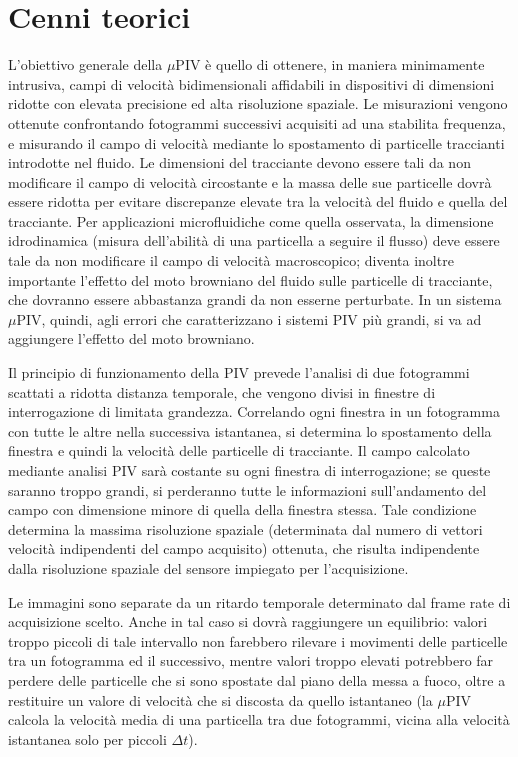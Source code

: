 \documentclass{article} %
\begin{document}
\section{Cenni teorici}
L'obiettivo generale della $\mu$PIV è quello di ottenere, in maniera minimamente intrusiva, campi di velocità bidimensionali affidabili in dispositivi di dimensioni ridotte con elevata precisione ed alta risoluzione spaziale. Le misurazioni vengono ottenute confrontando fotogrammi successivi acquisiti ad una stabilita frequenza, e misurando il campo di velocità mediante lo spostamento di particelle traccianti introdotte nel fluido. Le dimensioni del tracciante devono essere tali da non modificare il campo di velocità circostante e la massa delle sue particelle dovrà essere ridotta per evitare discrepanze elevate tra la velocità del fluido e quella del tracciante. Per applicazioni microfluidiche come quella osservata, la dimensione idrodinamica (misura dell'abilità di una particella a seguire il flusso) deve essere tale da non modificare il campo di velocità macroscopico; diventa inoltre importante l'effetto del moto browniano del fluido sulle particelle di tracciante, che dovranno essere abbastanza grandi da non esserne perturbate. In un sistema $\mu$PIV, quindi, agli errori che caratterizzano i sistemi PIV più grandi, si va ad aggiungere l'effetto del moto browniano.\par
Il principio di funzionamento della PIV prevede l'analisi di due fotogrammi scattati a ridotta distanza temporale, che vengono divisi in finestre di interrogazione di limitata grandezza. Correlando ogni finestra in un fotogramma con tutte le altre nella successiva istantanea, si determina lo spostamento della finestra e quindi la velocità delle particelle di tracciante. Il campo calcolato mediante analisi PIV sarà costante su ogni finestra di interrogazione; se queste saranno troppo grandi, si perderanno tutte le informazioni sull'andamento del campo con dimensione minore di quella della finestra stessa. Tale condizione determina la massima risoluzione spaziale (determinata dal numero di vettori velocità indipendenti del campo acquisito) ottenuta, che risulta indipendente dalla risoluzione spaziale del sensore impiegato per l'acquisizione.\par
Le immagini sono separate da un ritardo temporale determinato dal frame rate di acquisizione scelto. Anche in tal caso si dovrà raggiungere un equilibrio: valori troppo piccoli di tale intervallo non farebbero rilevare i movimenti delle particelle tra un fotogramma ed il successivo, mentre valori troppo elevati potrebbero far perdere delle particelle che si sono spostate dal piano della messa a fuoco, oltre a restituire un valore di velocità che si discosta da quello istantaneo (la $\mu$PIV calcola la velocità media di una particella tra due fotogrammi, vicina alla velocità istantanea solo per piccoli $\Delta t$).
\end{document}
